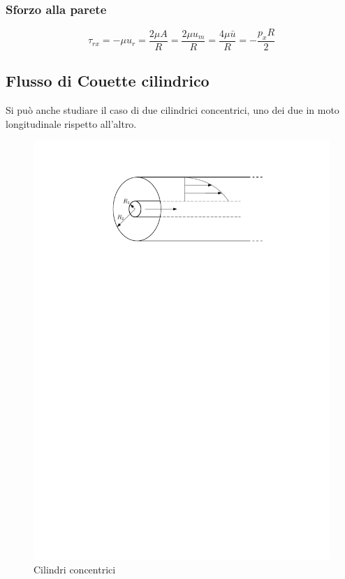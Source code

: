 \subsubsection{Sforzo alla parete}
%
	\begin{equation*}
		\tau_{rx} = - \mu u_r = \frac{2 \mu A}{R} = \frac{2 \mu u_m}{R} = \frac{4 \mu \bar{u}}{R} = - \frac{p_x R}{2}
	\end{equation*}
%

\subsection{Flusso di Couette cilindrico}
Si può anche studiare il caso di due cilindrici concentrici, uno dei due in moto longitudinale rispetto all'altro.
%
	\begin{figure}[ht]
		\includegraphics[scale=1.0]{./3.6 Soluzioni esatte equazioni di Navier-Stokes/3.6-4}
		\centering
		\caption{Cilindri concentrici}
	\end{figure}
